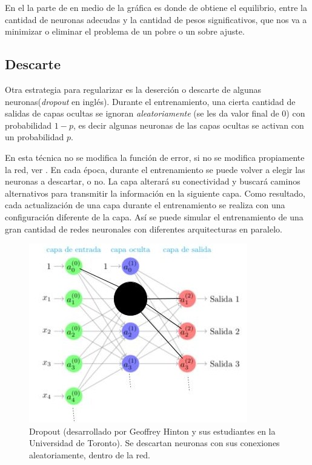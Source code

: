 En el la parte de en medio de la gráfica  es donde de obtiene el equilibrio, entre la cantidad de neuronas adecudas y la cantidad de pesos significativos, que nos va a minimizar o eliminar el problema de un pobre o un sobre ajuste.
 
 \subsection{Descarte}
 
 Otra estrategia para regularizar es la deserción o descarte de algunas neuronas(\emph{dropout} en inglés). 
 Durante el entrenamiento, una cierta cantidad de salidas de capas ocultas se ignoran \emph{aleatoriamente} (se les da valor final de 0) con probabilidad $1-p$, es decir algunas neuronas de las capas ocultas se activan con un probabilidad $p$. 

 En esta técnica no se modifica la función de error, si no se modifica propiamente la red, ver . En cada época, durante el entrenamiento se puede volver a elegir las neuronas a descartar, o no. 
 La capa alterará su conectividad y buscará caminos alternativos para transmitir la información en la siguiente capa. Como resultado, cada actualización de una capa durante el entrenamiento se realiza con una configuración diferente de la capa. Así se puede simular el entrenamiento de una gran cantidad de redes neuronales con diferentes arquitecturas en paralelo.

  \begin{figure}[h]
   \centering
   \includegraphics[scale=.5]{../Figuras/dropout.jpg}
   \caption{Dropout (desarrollado por Geoffrey Hinton y sus estudiantes en la Universidad de Toronto). Se descartan neuronas con sus conexiones aleatoriamente, dentro de la red.}
  \label{fig:dropout}
  \end{figure}

